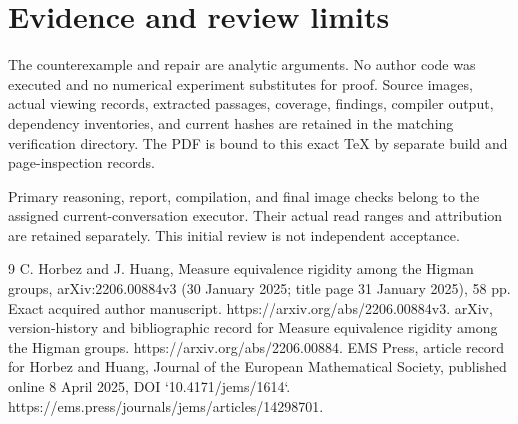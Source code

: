 \documentclass[10pt]{article}
\begin{document}
\section*{Evidence and review limits}
The counterexample and repair are analytic arguments. No author code was executed and no numerical experiment substitutes for proof. Source images, actual viewing records, extracted passages, coverage, findings, compiler output, dependency inventories, and current hashes are retained in the matching verification directory. The PDF is bound to this exact TeX by separate build and page-inspection records.\par
Primary reasoning, report, compilation, and final image checks belong to the assigned current-conversation executor. Their actual read ranges and attribution are retained separately. This initial review is not independent acceptance.\par
9 C. Horbez and J. Huang, Measure equivalence rigidity among the Higman groups, arXiv:2206.00884v3 (30 January 2025; title page 31 January 2025), 58 pp. Exact acquired author manuscript. https://arxiv.org/abs/2206.00884v3. arXiv, version-history and bibliographic record for Measure equivalence rigidity among the Higman groups. https://arxiv.org/abs/2206.00884. EMS Press, article record for Horbez and Huang, Journal of the European Mathematical Society, published online 8 April 2025, DOI `10.4171/jems/1614`. https://ems.press/journals/jems/articles/14298701.\par
\end{document}
